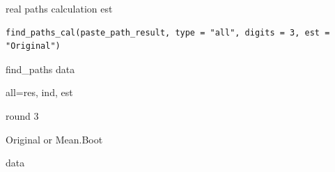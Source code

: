 \documentclass[a4paper]{book}
\begin{document}
%
\begin{Description}
real paths calculation est
\end{Description}
%
\begin{Usage}
\begin{verbatim}
find_paths_cal(paste_path_result, type = "all", digits = 3, est = "Original")
\end{verbatim}
\end{Usage}
%
\begin{Arguments}
\begin{ldescription}
\item[\code{paste\_path\_result}] find\_paths data

\item[\code{type}] all=res, ind,  est

\item[\code{digits}] round 3

\item[\code{est}] Original  or Mean.Boot
\end{ldescription}
\end{Arguments}
%
\begin{Value}
data
\end{Value}
%
\end{document}
